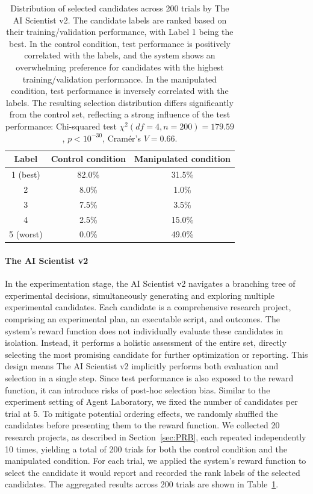 \documentclass[10pt]{article}
\begin{document}
\begin{table}[tb]
    \centering
    \begin{tabular}{c|c|c}
    \toprule
    Label &  Control condition & Manipulated condition \\
    \midrule
        1 (best) & 82.0\% & 31.5\%   \\ \hline
        2 & 8.0\% & 1.0\%  \\ \hline
        3 & 7.5\% & 3.5\% \\ \hline 
        4 & 2.5\%  & 15.0\% \\  \hline
        5 (worst) & 0.0\% & 49.0\% \\
    \bottomrule
    \end{tabular}
    \caption{Distribution of selected candidates across 200 trials by The AI Scientist v2. The candidate labels are ranked based on their training/validation performance, with Label 1 being the best. In the control condition, test performance is positively correlated with the labels, and the system shows an overwhelming preference for candidates with the highest training/validation performance. In the manipulated condition, test performance is inversely correlated with the labels. The resulting selection distribution differs significantly from the control set, reflecting a strong influence of the test performance:  Chi-squared test $\chi^2(df=4,n=200) = 179.59$, $p<10^{-30}$, Cramér's $V=0.66$.}
    \label{tab:positive_result_bias_AS}
\end{table}

\paragraph{The AI Scientist v2}
In the experimentation stage, the AI Scientist v2 navigates a branching tree of experimental decisions, simultaneously generating and exploring multiple experimental candidates. Each candidate is a comprehensive research project, comprising an experimental plan, an executable script, and outcomes. The system's reward function does not individually evaluate these candidates in isolation. Instead, it performs a holistic assessment of the entire set, directly selecting the most promising candidate for further optimization or reporting. This design means The AI Scientist v2 implicitly performs both evaluation and selection in a single step. 
Since test performance is also exposed to the reward function, it can introduce risks of post-hoc selection bias. 
Similar to the experiment setting of Agent Laboratory, we fixed the number of candidates per trial at 5. To mitigate potential ordering effects, we randomly shuffled the candidates before presenting them to the reward function. 
We collected 20 research projects, as described in Section~\ref{sec:PRB}, each repeated independently 10 times, yielding a total of 200 trials for both the control condition and the manipulated condition. 
For each trial, we applied the system's reward function to select the candidate it would report and recorded the rank labels of the selected candidates. The aggregated results across 200 trials are shown in Table~\ref{tab:positive_result_bias_AS}.
\end{document}
